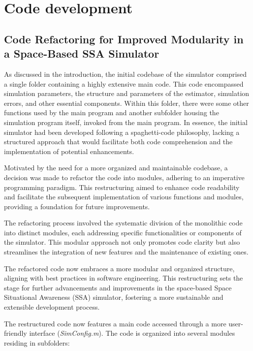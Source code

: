 \section{Code development}\label{s: Code}
\subsection{Code Refactoring for Improved Modularity in a Space-Based SSA Simulator}
As discussed in the introduction, the initial codebase of the simulator comprised a single folder containing a highly extensive main code. This code encompassed simulation parameters, the structure and parameters of the estimator, simulation errors, and other essential components. Within this folder, there were some other functions used by the main program and another subfolder housing the simulation program itself, invoked from the main program. In essence, the initial simulator had been developed following a spaghetti-code philosophy, lacking a structured approach that would facilitate both code comprehension and the implementation of potential enhancements.

Motivated by the need for a more organized and maintainable codebase, a decision was made to refactor the code into modules, adhering to an imperative programming paradigm. This restructuring aimed to enhance code readability and facilitate the subsequent implementation of various functions and modules, providing a foundation for future improvements.

The refactoring process involved the systematic division of the monolithic code into distinct modules, each addressing specific functionalities or components of the simulator. This modular approach not only promotes code clarity but also streamlines the integration of new features and the maintenance of existing ones.

The refactored code now embraces a more modular and organized structure, aligning with best practices in software engineering. This restructuring sets the stage for further advancements and improvements in the space-based Space Situational Awareness (SSA) simulator, fostering a more sustainable and extensible development process.

The restructured code now features a main code accessed through a more user-friendly interface (\textit{SimConfig.m}). The code is organized into several modules residing in subfolders:

